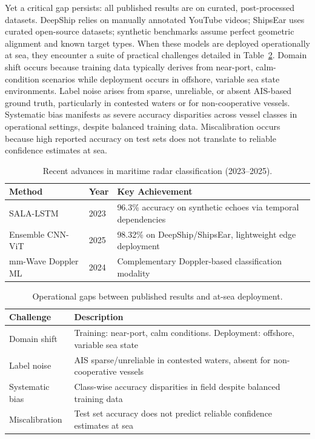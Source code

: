 \documentclass[twocolumn, 10pt]{article}
\begin{document}
Yet a critical gap persists: all published results are on curated, post-processed datasets. DeepShip relies on manually annotated YouTube videos; ShipsEar uses curated open-source datasets; synthetic benchmarks assume perfect geometric alignment and known target types. When these models are deployed operationally at sea, they encounter a suite of practical challenges detailed in Table~\ref{tab:deployment_gaps}. Domain shift occurs because training data typically derives from near-port, calm-condition scenarios while deployment occurs in offshore, variable sea state environments. Label noise arises from sparse, unreliable, or absent AIS-based ground truth, particularly in contested waters or for non-cooperative vessels. Systematic bias manifests as severe accuracy disparities across vessel classes in operational settings, despite balanced training data. Miscalibration occurs because high reported accuracy on test sets does not translate to reliable confidence estimates at sea.

\begin{table}[t]
\caption{Recent advances in maritime radar classification (2023--2025).}
\label{tab:radar_progress}
\centering
\small
\begin{tabular}{@{}llp{4cm}@{}}
\toprule
Method & Year & Key Achievement \\
\midrule
SALA-LSTM & 2023 & 96.3\% accuracy on synthetic echoes via temporal dependencies \\
\midrule
Ensemble CNN-ViT & 2025 & 98.32\% on DeepShip/ShipsEar, lightweight edge deployment \\
\midrule
mm-Wave Doppler ML & 2024 & Complementary Doppler-based classification modality \\
\bottomrule
\end{tabular}
\end{table}

\begin{table}[t]
\caption{Operational gaps between published results and at-sea deployment.}
\label{tab:deployment_gaps}
\centering
\small
\begin{tabular}{@{}lp{5cm}@{}}
\toprule
Challenge & Description \\
\midrule
Domain shift & Training: near-port, calm conditions. Deployment: offshore, variable sea state \\
\midrule
Label noise & AIS sparse/unreliable in contested waters, absent for non-cooperative vessels \\
\midrule
Systematic bias & Class-wise accuracy disparities in field despite balanced training data \\
\midrule
Miscalibration & Test set accuracy does not predict reliable confidence estimates at sea \\
\bottomrule
\end{tabular}
\end{table}
\end{document}
